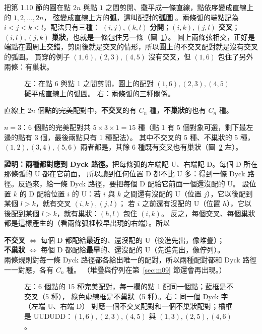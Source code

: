 把第 1.10 節的圓在點 $2n$ 與點 $1$ 之間剪開、攤平成一條直線，點依序變成直線上的 $1,2,\ldots,2n$，
弦變成直線上方的\textbf{弧}，這叫配對的\textbf{弧圖} 。兩條弧的端點記為 $i<j<k<l$，配法只有三種：
$(i,j),(k,l)$ \textbf{分開}；$(i,k),(j,l)$ \textcolor{cBad}{\textbf{交叉}}；
$(i,l),(j,k)$ \textcolor{violet!75!black}{\textbf{巢狀}}，也就是一條包住另一條（圖~\ref{fig:m06-cut}）。
圓上兩條弦相交，正好是端點在圓周上交錯，剪開後就是交叉的情形，所以圓上的不交叉配對就是沒有交叉的弧圖。
貫穿的例子 $(1,6),(2,3),(4,5)$ 沒有交叉，但 $(1,6)$ 包住了另外兩條：有巢狀。

\begin{figure}[H]
\centering
\FigMsixCut
\caption{左：在點 6 與點 1 之間剪開，圓上的配對 $(1,6),(2,3),(4,5)$ 攤平成直線上的弧圖。
右：兩條弧的三種關係。}
\label{fig:m06-cut}
\end{figure}

\begin{thmbox}[不交叉與不巢狀]
直線上 $2n$ 個點的完美配對中，\textbf{不交叉}的有 $C_n$ 種，\textbf{不巢狀}的也有 $C_n$ 種。
\end{thmbox}

$n=3$：6 個點的完美配對共 $5\times3\times1=15$ 種（點 1 有 5 個對象可選，剩下最左邊的點有 3 個，最後兩點只有 1 種配法）。
其中不交叉的 5 種、不巢狀的 5 種，$(1,2),(3,4),(5,6)$ 兩者都是，其餘 6 種既有交叉也有巢狀（圖~\ref{fig:m06-count} 左）。

\textbf{證明：兩種都對應到 Dyck 路徑。}把每條弧的左端記 U、右端記 D。每個 D 所在那條弧的 U 都在它前面，
所以讀到任何位置 D 都不比 U 多：得到一條 Dyck 路徑。反過來，給一條 Dyck 路徑，要把每個 D 配給它前面一個還沒配的 U。
設位置 $k$ 的 D 配給位置 $i$ 的 U：若 $i$ 與 $k$ 之間還有沒配的 U（位置 $j$），它以後配到某個 $l>k$，就有交叉 $(i,k),(j,l)$；
若 $i$ 之前還有沒配的 U（位置 $h$），它以後配到某個 $l>k$，就有巢狀：$(h,l)$ 包住 $(i,k)$。
反之，每個交叉、每個巢狀都是這樣產生的（看兩條弧裡較早出現的右端）。所以

\begin{keybox}
\textbf{不交叉} $\iff$ 每個 D 都配給\textbf{最近}的、還沒配的 U（後進先出，像堆疊）；\\
\textbf{不巢狀} $\iff$ 每個 D 都配給\textbf{最早}的、還沒配的 U（先進先出，像佇列）。\\
兩條規則對每一條 Dyck 路徑都各給出唯一的配對，所以兩種配對都和 Dyck 路徑一一對應，各有 $C_n$ 種。
（堆疊與佇列在第~\ref{sec:m09} 節還會再出現。）
\end{keybox}

\begin{figure}[H]
\centering
\FigMsixCount
\caption{左：6 個點的 15 種完美配對，每一欄的點 1 配同一個點；\textcolor{cA}{藍框}是不交叉（5 種），
\textcolor{green!50!black}{綠色虛線框}是不巢狀（5 種）。右：同一個 Dyck 字（左端 U、右端 D）
對應一個不交叉配對和一個不巢狀配對；\textcolor{cTop}{橘框}是 UUDUDD：$(1,6),(2,3),(4,5)$ 與 $(1,3),(2,5),(4,6)$。}
\label{fig:m06-count}
\end{figure}

